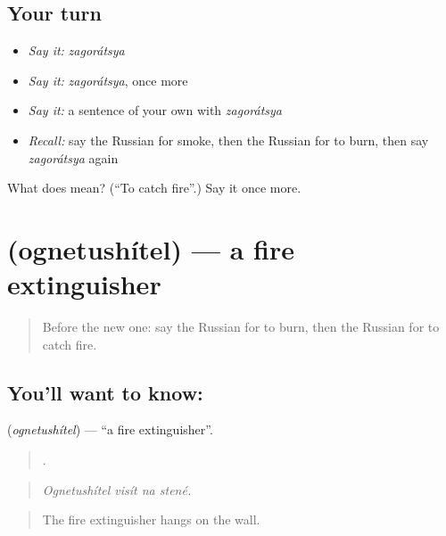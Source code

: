\subsection*{Your turn}
\begin{itemize}
\raggedright
  \item \emph{Say it:} \emph{zagorátsya}
  \item \emph{Say it:} \emph{zagorátsya}, once more
  \item \emph{Say it:} a sentence of your own with \emph{zagorátsya}
  \item \emph{Recall:} say the Russian for smoke, then the Russian for to burn, then say \emph{zagorátsya} again
\end{itemize}

\begin{tcolorbox}[breakable,colback=teal!4,colframe=teal!35!black,title={Before you move on}]
What does  mean? (\textquotedblleft{}To catch fire\textquotedblright{}.) Say it once more.
\end{tcolorbox}
\section[\texorpdfstring{\ru{огнетушитель} (ognetushítel)}{огнетушитель (ognetushítel)}]{ (ognetushítel) — a fire extinguisher}

\label{lesson:RU-C295-ognetushitel}



\begin{quote}
Before the new one: say the Russian for to burn, then the Russian for to catch fire.
\end{quote}

\subsection*{You'll want to know: }
\textbf{} (\emph{ognetushítel}) — \textquotedblleft{}a fire extinguisher\textquotedblright{}.

\begin{quote}
   .
\end{quote}

\begin{quote}
\emph{Ognetushítel visít na stené.}
\end{quote}

\begin{quote}
The fire extinguisher hangs on the wall.
\end{quote}

